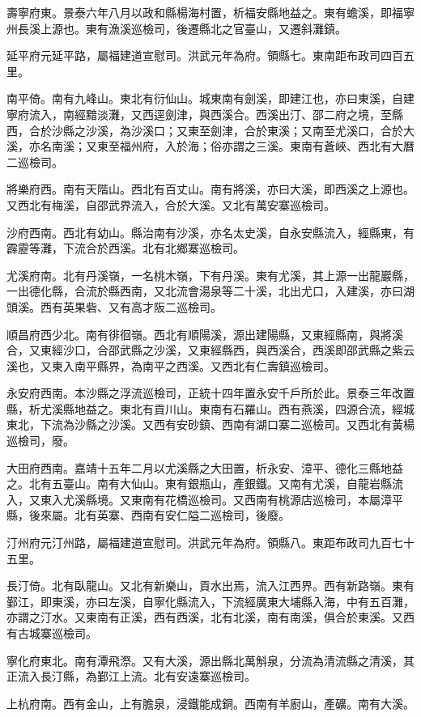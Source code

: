 壽寧府東。景泰六年八月以政和縣楊海村置，析福安縣地益之。東有蟾溪，即福寧州長溪上源也。東有漁溪巡檢司，後遷縣北之官臺山，又遷斜灘鎮。

延平府元延平路，屬福建道宣慰司。洪武元年為府。領縣七。東南距布政司四百五里。

南平倚。南有九峰山。東北有衍仙山。城東南有劍溪，即建江也，亦曰東溪，自建寧府流入，南經黯淡灘，又西逕劍津，與西溪合。西溪出汀、邵二府之境，至縣西，合於沙縣之沙溪，為沙溪口；又東至劍津，合於東溪；又南至尤溪口，合於大溪，亦名南溪；又東至福州府，入於海；俗亦謂之三溪。東南有蒼峽、西北有大曆二巡檢司。

將樂府西。南有天階山。西北有百丈山。南有將溪，亦曰大溪，即西溪之上源也。又西北有梅溪，自邵武界流入，合於大溪。又北有萬安寨巡檢司。

沙府西南。西北有幼山。縣治南有沙溪，亦名太史溪，自永安縣流入，經縣東，有霹靂等灘，下流合於西溪。北有北鄉寨巡檢司。

尤溪府南。北有丹溪嶺，一名桃木嶺，下有丹溪。東有尤溪，其上源一出龍巖縣，一出德化縣，合流於縣西南，又北流會湯泉等二十溪，北出尤口，入建溪，亦曰湖頭溪。西有英果砦、又有高才阪二巡檢司。

順昌府西少北。南有徘徊嶺。西北有順陽溪，源出建陽縣，又東經縣南，與將溪合，又東經沙口，合邵武縣之沙溪，又東經縣西，與西溪合，西溪即邵武縣之紫云溪也，又東入南平縣界，為南平之西溪。又西北有仁壽鎮巡檢司。

永安府西南。本沙縣之浮流巡檢司，正統十四年置永安千戶所於此。景泰三年改置縣，析尤溪縣地益之。東北有貢川山。東南有石羅山。西有燕溪，四源合流，經城東北，下流為沙縣之沙溪。又西有安砂鎮、西南有湖口寨二巡檢司。又西北有黃楊巡檢司，廢。

大田府西南。嘉靖十五年二月以尤溪縣之大田置，析永安、漳平、德化三縣地益之。北有五臺山。南有大仙山。東有銀瓶山，產銀鐵。又南有尤溪，自龍岩縣流入，又東入尤溪縣境。又東南有花橋巡檢司。又西南有桃源店巡檢司，本屬漳平縣，後來屬。北有英寨、西南有安仁隘二巡檢司，後廢。

汀州府元汀州路，屬福建道宣慰司。洪武元年為府。領縣八。東距布政司九百七十五里。

長汀倚。北有臥龍山。又北有新樂山，貢水出焉，流入江西界。西有新路嶺。東有鄞江，即東溪，亦曰左溪，自寧化縣流入，下流經廣東大埔縣入海，中有五百灘，亦謂之汀水。又東南有正溪，西有西溪，北有北溪，南有南溪，俱合於東溪。又西有古城寨巡檢司。

寧化府東北。南有潭飛漈。又有大溪，源出縣北萬斛泉，分流為清流縣之清溪，其正流入長汀縣，為鄞江上流。北有安遠寨巡檢司。

上杭府南。西有金山，上有膽泉，浸鐵能成銅。西南有羊廚山，產礦。南有大溪。

